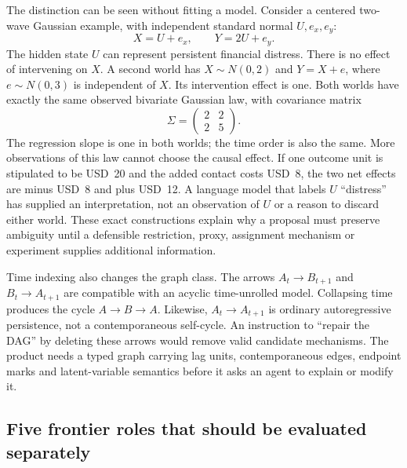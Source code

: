 The distinction can be seen without fitting a model. Consider a centered
two-wave Gaussian example, with independent standard normal $U,e_x,e_y$:
\[
 X=U+e_x,\qquad Y=2U+e_y.
\]
The hidden state $U$ can represent persistent financial distress. There is no
effect of intervening on $X$. A second world has $X\sim N(0,2)$ and
$Y=X+e$, where $e\sim N(0,3)$ is independent of $X$. Its intervention effect
is one. Both worlds have exactly the same observed bivariate Gaussian law,
with covariance matrix
\[
 \Sigma=\begin{pmatrix}2&2\\2&5\end{pmatrix}.
\]
The regression slope is one in both worlds; the time order is also the same.
More observations of this law cannot choose the causal effect. If one outcome
unit is stipulated to be USD~20 and the added contact costs USD~8, the two net
effects are minus USD~8 and plus USD~12. A language model that labels $U$
``distress'' has supplied an interpretation, not an observation of $U$ or a
reason to discard either world. These exact constructions explain why a
proposal must preserve ambiguity until a defensible restriction, proxy,
assignment mechanism or experiment supplies additional information.
\citep{exec15_latent_exact}

Time indexing also changes the graph class. The arrows
$A_t\to B_{t+1}$ and $B_t\to A_{t+1}$ are compatible with an acyclic
time-unrolled model. Collapsing time produces the cycle $A\to B\to A$.
Likewise, $A_t\to A_{t+1}$ is ordinary autoregressive persistence, not a
contemporaneous self-cycle. An instruction to ``repair the DAG'' by deleting
these arrows would remove valid candidate mechanisms. The product needs a
typed graph carrying lag units, contemporaneous edges, endpoint marks and
latent-variable semantics before it asks an agent to explain or modify it.
\citep{exec15_latent_exact,exec15_latent_design}

\subsection{Five frontier roles that should be evaluated separately}

